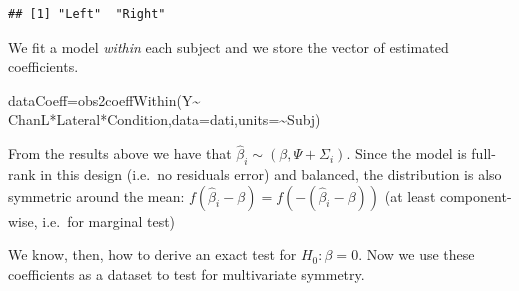 \documentclass[
]{article}
\newenvironment{Shaded}{\begin{snugshade}}{\end{snugshade}}
\newcommand{\AttributeTok}[1]{\textcolor[rgb]{0.77,0.63,0.00}{#1}}
\newcommand{\CommentTok}[1]{\textcolor[rgb]{0.56,0.35,0.01}{\textit{#1}}}
\newcommand{\ConstantTok}[1]{\textcolor[rgb]{0.00,0.00,0.00}{#1}}
\newcommand{\FunctionTok}[1]{\textcolor[rgb]{0.00,0.00,0.00}{#1}}
\newcommand{\NormalTok}[1]{#1}
\newcommand{\OtherTok}[1]{\textcolor[rgb]{0.56,0.35,0.01}{#1}}
\newcommand{\SpecialCharTok}[1]{\textcolor[rgb]{0.00,0.00,0.00}{#1}}
\newcommand{\StringTok}[1]{\textcolor[rgb]{0.31,0.60,0.02}{#1}}
\begin{document}
\begin{verbatim}
## [1] "Left"  "Right"
\end{verbatim}

\begin{Shaded}
\end{Shaded}

We fit a model \emph{within} each subject and we store the vector of
estimated coefficients.

\begin{Shaded}
\begin{Highlighting}[]
\NormalTok{dataCoeff}\OtherTok{=}\FunctionTok{obs2coeffWithin}\NormalTok{(Y}\SpecialCharTok{\textasciitilde{}}\NormalTok{ ChanL}\SpecialCharTok{*}\NormalTok{Lateral}\SpecialCharTok{*}\NormalTok{Condition,}\AttributeTok{data=}\NormalTok{dati,}\AttributeTok{units=}\SpecialCharTok{\textasciitilde{}}\NormalTok{Subj)}
\end{Highlighting}
\end{Shaded}

From the results above we have that
\(\hat\beta_i\sim (\beta,\Psi+\Sigma_i)\). Since the model is full-rank
in this design (i.e.~no residuals error) and balanced, the distribution
is also symmetric around the mean:
\(f(\hat\beta_i-\beta)=f(-(\hat\beta_i-\beta))\) (at least
component-wise, i.e.~for marginal test)

We know, then, how to derive an exact test for \(H_0: \beta=0\). Now we
use these coefficients as a dataset to test for multivariate symmetry.
\end{document}
